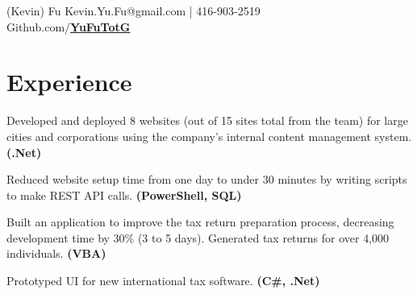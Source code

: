 \documentclass[letterpaper]{kevin-resume} %
\begin{document}


 {(Kevin) Fu} { %
	Kevin.Yu.Fu@gmail.com | 416-903-2519 \\ %
	Github.com/\href{https://github.com/YuFuTotG} {\textbf{YuFuTotG}} %
}


\begin{minipage}[t]{0.66\textwidth} %


\section{Experience}

\vspace{\topsep} %
\begin{tightitemize}
	\item Developed and deployed 8 websites (out of 15 sites total from the team) for large cities and corporations using the company's internal content management system. \textbf{(.Net)}
	\item Reduced website setup time from one day to under 30 minutes by writing scripts to make REST API calls. \textbf{(PowerShell, SQL)}
\end{tightitemize}

\sectionspace %


\begin{tightitemize}
	\item Built an application to improve the tax return preparation process, decreasing development time by 30\% (3 to 5 days). Generated tax returns for over 4,000 individuals. \textbf{(VBA)}
	\item Prototyped UI for new international tax software. \textbf{(C\#, .Net)}
\end{tightitemize}


\end{minipage}
\end{document}
